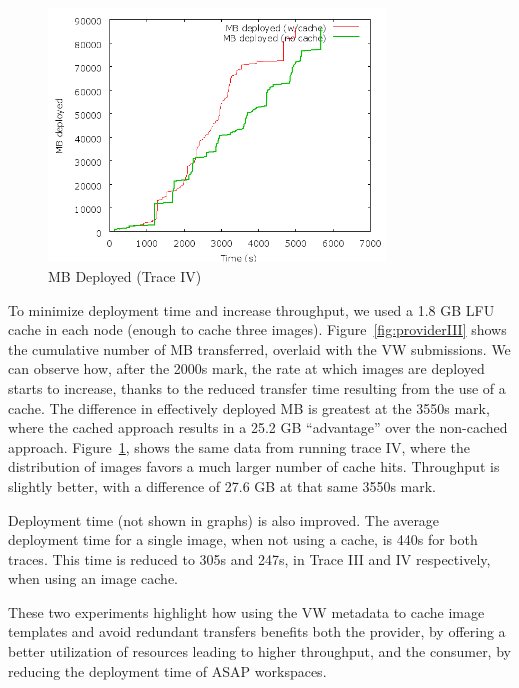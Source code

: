 \documentclass[singlespace]{ccw_chithesis}
\begin{document}
\begin{figure}
  \begin{center}
    \includegraphics[width=0.8\textwidth]{figures/ProviderPerspective-Pareto2.png}
    \caption{MB Deployed (Trace IV)}
	\label{fig:providerIV}
  \end{center}
\end{figure}

To minimize deployment time and increase throughput, we used a 1.8 GB
LFU cache in each node (enough to cache three images). Figure~\ref{fig:providerIII} shows
the cumulative number of MB transferred, overlaid with the VW
submissions. We can observe how, after the 2000s mark, the rate at
which images are deployed starts to increase, thanks to the reduced
transfer time resulting from the use of a cache. The difference in
effectively deployed MB is greatest at the 3550s mark, where the cached
approach results in a 25.2 GB ``advantage'' over the non{}-cached
approach. Figure~\ref{fig:providerIV}, shows the same data from running trace IV, where
the distribution of images favors a much larger number of cache hits.
Throughput is slightly better, with a difference of 27.6 GB at that
same 3550s mark.

Deployment time (not shown in graphs) is also improved. The average
deployment time for a single image, when not using a cache, is 440s for
both traces. This time is reduced to 305s and 247s, in Trace III and IV
respectively, when using an image cache.

These two experiments highlight how using the VW metadata to cache image
templates and avoid redundant transfers benefits both the provider, by
offering a better utilization of resources leading to higher
throughput, and the consumer, by reducing the deployment time of ASAP
workspaces.
\end{document}
